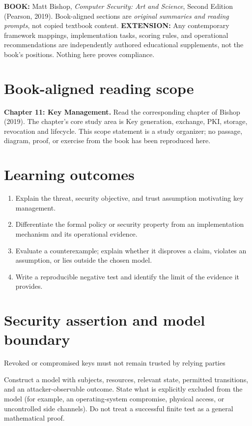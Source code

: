 \documentclass[10pt,letterpaper]{article}
\begin{document}
\makedoctocpage
\begin{notebox}
\textbf{BOOK:} Matt Bishop, \emph{Computer Security: Art and Science}, Second Edition (Pearson, 2019). Book-aligned sections are \emph{original summaries and reading prompts}, not copied textbook content.
\textbf{EXTENSION:} Any contemporary framework mappings, implementation tasks, scoring rules, and operational recommendations are independently authored educational supplements, not the book's positions. Nothing here proves compliance.
\end{notebox}
\section{Book-aligned reading scope}
\textbf{Chapter 11: Key Management.} Read the corresponding chapter of Bishop (2019). The chapter's core study area is Key generation, exchange, PKI, storage, revocation and lifecycle. This scope statement is a study organizer; no passage, diagram, proof, or exercise from the book has been reproduced here.
\section{Learning outcomes}
\begin{enumerate}
\item Explain the threat, security objective, and trust assumption motivating key management.
\item Differentiate the formal policy or security property from an implementation mechanism and its operational evidence.
\item Evaluate a counterexample; explain whether it disproves a claim, violates an assumption, or lies outside the chosen model.
\item Write a reproducible negative test and identify the limit of the evidence it provides.
\end{enumerate}
\section{Security assertion and model boundary}
\begin{infobox}
Revoked or compromised keys must not remain trusted by relying parties
\end{infobox}
Construct a model with subjects, resources, relevant state, permitted transitions, and an attacker-observable outcome. State what is explicitly excluded from the model (for example, an operating-system compromise, physical access, or uncontrolled side channels). Do not treat a successful finite test as a general mathematical proof.
\end{document}
